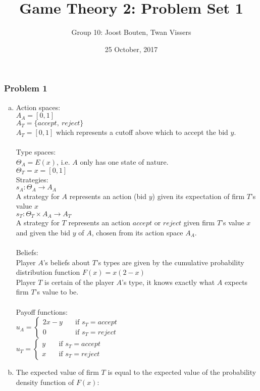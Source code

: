 \documentclass[a4paper]{article}
\author{Group 10: Joost Bouten, Twan Vissers}
\date{25 October, 2017}
\title{Game Theory 2: Problem Set 1}
\begin{document}
\maketitle
\subsubsection{Problem 1}
\begin{enumerate}[(a)]
\item
Action spaces:\\
$A_A=[0,1]$\\
$A_T=\{accept,\ reject\}$\\
$A_T=[0,1]$ which represents a cutoff above which to accept the bid $y$.\\
\\
Type spaces:\\
$\Theta_A=E(x)$, i.e. $A$ only has one state of nature.\\
$\Theta_T=x=[0,1]$\\

Strategies:\\
$s_A:\Theta_A\rightarrow A_A$\\
A strategy for $A$ represents an action (bid $y$) given its expectation of firm $T$'s value $x$
\\ 
$s_T: \Theta_T \times A_A \rightarrow A_T$\\ A strategy for $T$ represents an action $accept$ or $reject$ given firm $T$'s value $x$ and given the bid $y$ of $A$, chosen from its action space $A_A$. 
\\ \\
Beliefs:\\
Player $A$'s beliefs about $T$'s types are given by the cumulative probability distribution function $F(x)=x(2-x)$
\\
Player $T$ is certain of the player $A$'s type, it knows exactly what $A$ expects firm $T$'s value to be. 
\\
\\
Payoff functions:\\
$u_A=\begin{cases}
2x-y & \quad \text{if }
s_T=accept\\
0 & \quad \text{if } s_T=reject
\end{cases}
$
\\
$u_T=\begin{cases}
y & \quad \text{if }
s_T=accept\\
x & \quad \text{if } s_T=reject
\end{cases}
$
\\
\item
The expected value of firm $T$ is equal to the expected value of the probability density function of $F(x)$:


\end{enumerate}
\end{document}
